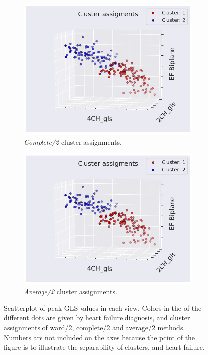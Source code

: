 \begin{figure}[htb]
    \begin{subfigure}[b]{0.49\textwidth}
        \centering
        \includegraphics[width=0.99\textwidth]{results/scatter_gls_EF_complete2.png}
        \caption{\textit{Complete/2} cluster assignments.}
        \label{fig:scatter_gls_ef_complete2}
    \end{subfigure}
    \begin{subfigure}[b]{0.49\textwidth}
        \centering
        \includegraphics[width=0.99\textwidth]{results/scatter_gls_EF_average2.png}
        \caption{\textit{Average/2} cluster assignments.}
        \label{fig:scatter_gls_ef_average2}
    \end{subfigure}
    \caption{Scatterplot of peak GLS values in each view. Colors in the of the different dots are given by heart failure diagnosis, and cluster assignments of 
             ward/2, complete/2 and average/2 methods. Numbers are not included on the axes because the point of the figure is to illustrate the separability 
             of clusters, and heart failure.}
             \label{fig:scatter_gls_ef_hf_cluster_assignments}
\end{figure}

